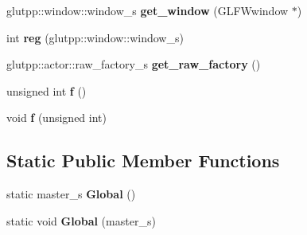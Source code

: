 \begin{DoxyCompactItemize}
\item 
\hypertarget{classglutpp_1_1master_acf692194f5c27b5dfd38e8bc4b4e964f}{glutpp\-::window\-::window\-\_\-s {\bfseries get\-\_\-window} (\-G\-L\-F\-Wwindow $\ast$)}\label{classglutpp_1_1master_acf692194f5c27b5dfd38e8bc4b4e964f}

\item 
\hypertarget{classglutpp_1_1master_a421473396319973aab3f23c8d0af5e1b}{int {\bfseries reg} (glutpp\-::window\-::window\-\_\-s)}\label{classglutpp_1_1master_a421473396319973aab3f23c8d0af5e1b}

\item 
\hypertarget{classglutpp_1_1master_a7d3e7f660c81e0e34302167d58082a1b}{glutpp\-::actor\-::raw\-\_\-factory\-\_\-s {\bfseries get\-\_\-raw\-\_\-factory} ()}\label{classglutpp_1_1master_a7d3e7f660c81e0e34302167d58082a1b}

\item 
\hypertarget{classglutpp_1_1master_ac2a0598fc64a3539f7420bdde0df3c70}{unsigned int {\bfseries f} ()}\label{classglutpp_1_1master_ac2a0598fc64a3539f7420bdde0df3c70}

\item 
\hypertarget{classglutpp_1_1master_a29cbe228119a761cf28a55a716cb3e12}{void {\bfseries f} (unsigned int)}\label{classglutpp_1_1master_a29cbe228119a761cf28a55a716cb3e12}

\end{DoxyCompactItemize}
\subsection*{\-Static \-Public \-Member \-Functions}
\begin{DoxyCompactItemize}
\item 
\hypertarget{classglutpp_1_1master_a6b0305d3c835658a32055b3f3e352768}{static master\-\_\-s {\bfseries \-Global} ()}\label{classglutpp_1_1master_a6b0305d3c835658a32055b3f3e352768}

\item 
\hypertarget{classglutpp_1_1master_a94dc3d3ac3b32a747f7e998a8a7fa881}{static void {\bfseries \-Global} (master\-\_\-s)}\label{classglutpp_1_1master_a94dc3d3ac3b32a747f7e998a8a7fa881}

\end{DoxyCompactItemize}
